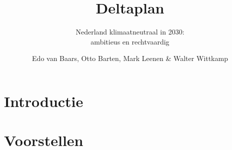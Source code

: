 \documentclass[DIV=calc]{scrbook}
\title{Deltaplan}
\subtitle{Nederland klimaatneutraal in 2030:\\ambitieus en rechtvaardig}
\author{Edo van Baars, Otto Barten, Mark Leenen \& Walter Wittkamp}
\begin{document}




\tableofcontents

\part{Introductie}
% 

% 
% 


\part{Voorstellen}


\end{document}
